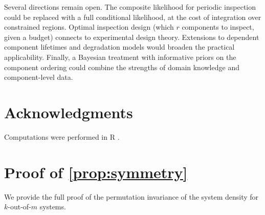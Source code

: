 \documentclass[12pt]{article}
\begin{document}
Several directions remain open.  The composite likelihood for periodic
inspection could be replaced with a full conditional likelihood, at the
cost of integration over constrained regions.  Optimal inspection design
(which $r$ components to inspect, given a budget) connects to experimental
design theory.  Extensions to dependent component lifetimes and degradation
models would broaden the practical applicability.  Finally, a Bayesian
treatment with informative priors on the component ordering could combine
the strengths of domain knowledge and component-level data.


\section*{Acknowledgments}

Computations were performed in R \citep{RCore2025}.


\appendix

\section{Proof of \texorpdfstring{\cref{prop:symmetry}}{Proposition 1}}
\label{sec:proof-symmetry}

We provide the full proof of the permutation invariance of the system
density for $k$-out-of-$m$ systems.
\end{document}
